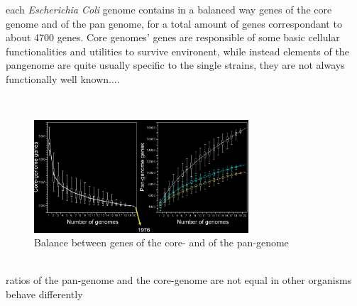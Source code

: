each \emph{Escherichia Coli} genome contains in a balanced way genes of the core genome and of the pan genome, for a total amount of genes correspondant to about 4700 genes. Core genomes' genes are responsible of some basic cellular functionalities and utilities to survive environent, while instead elements of the pangenome are quite usually specific to the single strains, they are not always functionally well known.... 

\\

\begin{figure}[h]
\caption{Balance between genes of the core- and of the pan-genome}
\centering
\includegraphics[width=8cm]{corePanGenEcoli}
\end{figure}

\\


ratios of the pan-genome and the core-genome are not equal in other
organisms behave differently